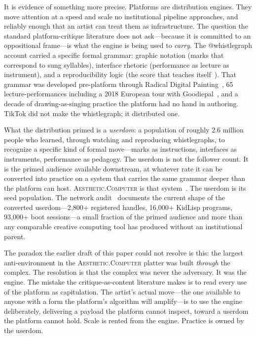 \documentclass[10pt,letterpaper,twocolumn]{article}
\newcommand{\ac}{\textsc{Aesthetic.Computer}}
\begin{document}
It is evidence of something more precise. Platforms are distribution engines. They move attention at a speed and scale no institutional pipeline approaches, and reliably enough that an artist can treat them as infrastructure. The question the standard platform-critique literature does not ask---because it is committed to an oppositional frame---is what the engine is being used to \emph{carry}. The @whistlegraph account carried a specific formal grammar: graphic notation (marks that correspond to sung syllables), interface rhetoric (performance as lecture as instrument), and a reproducibility logic (the score that teaches itself~\citep{scudder2026whistlegraph}). That grammar was developed pre-platform through Radical Digital Painting~\citep{scudder2017manifesto, scudder2018rdp35c3}, 65 lecture-performances including a 2018 European tour with Goodiepal~\citep{scudder2026goodiepal}, and a decade of drawing-as-singing practice the platform had no hand in authoring. TikTok did not make the whistlegraph; it distributed one.

What the distribution primed is a \emph{userdom}: a population of roughly 2.6 million people who learned, through watching and reproducing whistlegraphs, to recognize a specific kind of formal move---marks as instructions, interfaces as instruments, performance as pedagogy. The userdom is not the follower count. It is the primed audience available downstream, at whatever rate it can be converted into practice on a system that carries the same grammar deeper than the platform can host. \ac{} is that system~\citep{scudder2026ac}. The userdom is its seed population. The network audit~\citep{scudder2026audit} documents the current shape of the converted userdom---2{,}800+ registered handles, 16{,}000+ KidLisp programs, 93{,}000+ boot sessions---a small fraction of the primed audience and more than any comparable creative computing tool has produced without an institutional parent.

The paradox the earlier draft of this paper could not resolve is this: the largest anti-environment in the \ac{} platter was built \emph{through} the complex. The resolution is that the complex was never the adversary. It was the engine. The mistake the critique-as-content literature makes is to read every use of the platform as capitulation. The artist's actual move---the one available to anyone with a form the platform's algorithm will amplify---is to use the engine deliberately, delivering a payload the platform cannot inspect, toward a userdom the platform cannot hold. Scale is rented from the engine. Practice is owned by the userdom.
\end{document}
